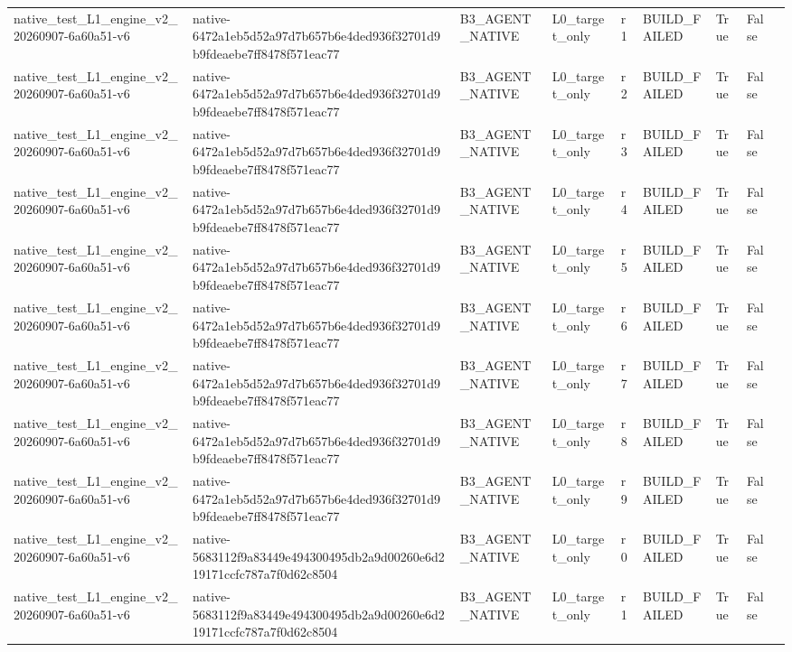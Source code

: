 \begin{tabular}{lllllllll}
native\_test\_L1\_engine\_v2\_20260907-6a60a51-v6 & native-6472a1eb5d52a97d7b657b6e4ded936f32701d9b9fdeaebe7ff8478f571eac77 & B3\_AGENT\_NATIVE & L0\_target\_only & r1 & BUILD\_FAILED & True & False &  \\
native\_test\_L1\_engine\_v2\_20260907-6a60a51-v6 & native-6472a1eb5d52a97d7b657b6e4ded936f32701d9b9fdeaebe7ff8478f571eac77 & B3\_AGENT\_NATIVE & L0\_target\_only & r2 & BUILD\_FAILED & True & False &  \\
native\_test\_L1\_engine\_v2\_20260907-6a60a51-v6 & native-6472a1eb5d52a97d7b657b6e4ded936f32701d9b9fdeaebe7ff8478f571eac77 & B3\_AGENT\_NATIVE & L0\_target\_only & r3 & BUILD\_FAILED & True & False &  \\
native\_test\_L1\_engine\_v2\_20260907-6a60a51-v6 & native-6472a1eb5d52a97d7b657b6e4ded936f32701d9b9fdeaebe7ff8478f571eac77 & B3\_AGENT\_NATIVE & L0\_target\_only & r4 & BUILD\_FAILED & True & False &  \\
native\_test\_L1\_engine\_v2\_20260907-6a60a51-v6 & native-6472a1eb5d52a97d7b657b6e4ded936f32701d9b9fdeaebe7ff8478f571eac77 & B3\_AGENT\_NATIVE & L0\_target\_only & r5 & BUILD\_FAILED & True & False &  \\
native\_test\_L1\_engine\_v2\_20260907-6a60a51-v6 & native-6472a1eb5d52a97d7b657b6e4ded936f32701d9b9fdeaebe7ff8478f571eac77 & B3\_AGENT\_NATIVE & L0\_target\_only & r6 & BUILD\_FAILED & True & False &  \\
native\_test\_L1\_engine\_v2\_20260907-6a60a51-v6 & native-6472a1eb5d52a97d7b657b6e4ded936f32701d9b9fdeaebe7ff8478f571eac77 & B3\_AGENT\_NATIVE & L0\_target\_only & r7 & BUILD\_FAILED & True & False &  \\
native\_test\_L1\_engine\_v2\_20260907-6a60a51-v6 & native-6472a1eb5d52a97d7b657b6e4ded936f32701d9b9fdeaebe7ff8478f571eac77 & B3\_AGENT\_NATIVE & L0\_target\_only & r8 & BUILD\_FAILED & True & False &  \\
native\_test\_L1\_engine\_v2\_20260907-6a60a51-v6 & native-6472a1eb5d52a97d7b657b6e4ded936f32701d9b9fdeaebe7ff8478f571eac77 & B3\_AGENT\_NATIVE & L0\_target\_only & r9 & BUILD\_FAILED & True & False &  \\
native\_test\_L1\_engine\_v2\_20260907-6a60a51-v6 & native-5683112f9a83449e494300495db2a9d00260e6d219171ccfc787a7f0d62c8504 & B3\_AGENT\_NATIVE & L0\_target\_only & r0 & BUILD\_FAILED & True & False &  \\
native\_test\_L1\_engine\_v2\_20260907-6a60a51-v6 & native-5683112f9a83449e494300495db2a9d00260e6d219171ccfc787a7f0d62c8504 & B3\_AGENT\_NATIVE & L0\_target\_only & r1 & BUILD\_FAILED & True & False &  \\

\end{tabular}
